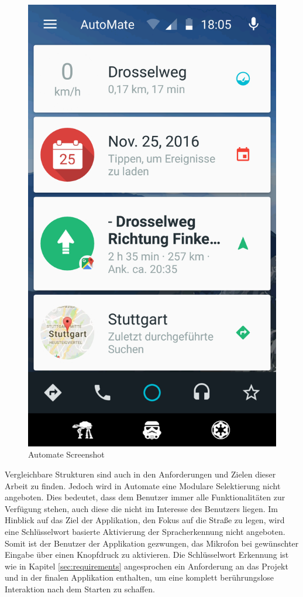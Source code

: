 \begin{figure}[h]
	\centering
  \includegraphics[scale=0.2]{images/Automate_Dashboard.png}
	\caption{Automate Screenshot}
	\label{figAutomate}
\end{figure}
Vergleichbare Strukturen sind auch in den Anforderungen und Zielen dieser Arbeit zu finden. Jedoch wird in Automate eine Modulare Selektierung nicht angeboten. Dies bedeutet, dass dem Benutzer immer alle Funktionalitäten zur Verfügung stehen, auch diese die nicht im Interesse des Benutzers liegen. Im Hinblick auf das Ziel der Applikation, den Fokus auf die Straße zu legen, wird eine Schlüsselwort basierte Aktivierung der Spracherkennung nicht angeboten. Somit ist der Benutzer der Applikation gezwungen, das Mikrofon bei gewünschter Eingabe über einen Knopfdruck zu aktivieren. Die Schlüsselwort Erkennung ist wie in Kapitel \ref{sec:requirements} angesprochen ein Anforderung an das Projekt und in der finalen Applikation enthalten, um eine komplett berührungslose Interaktion nach dem Starten zu schaffen. 

